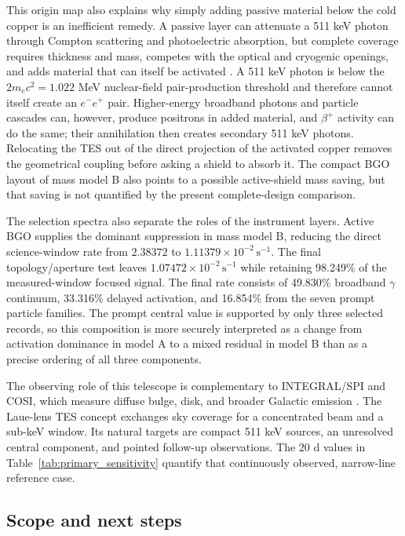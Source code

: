 \documentclass[11pt]{article}
\newcommand{\cps}{\ensuremath{\,\mathrm{s^{-1}}}}
\begin{document}
This origin map also explains why simply adding passive material below the cold
copper is an inefficient remedy. A passive layer can attenuate a 511 keV photon
through Compton scattering and photoelectric absorption, but complete coverage
requires thickness and mass, competes with the optical and cryogenic openings,
and adds material that can itself be activated \cite{NISTXCOM}. A 511 keV
photon is below the $2m_ec^2=1.022$ MeV nuclear-field pair-production
threshold and therefore cannot itself create an $e^-e^+$ pair. Higher-energy
broadband photons and particle cascades can, however, produce positrons in added
material, and $\beta^+$ activity can do the same; their annihilation then
creates secondary 511 keV photons. Relocating the TES out of the direct
projection of the activated copper removes the geometrical coupling before
asking a shield to absorb it. The compact BGO layout of mass model B also points
to a possible active-shield mass saving, but that saving is not quantified by
the present complete-design comparison.

The selection spectra also separate the roles of the instrument layers. Active
BGO supplies the dominant suppression in mass model B, reducing the direct
science-window rate from $2.38372$ to $1.11379\times10^{-2}\cps$. The final
topology/aperture test leaves $1.07472\times10^{-2}\cps$ while retaining
98.249\% of the measured-window focused signal. The final rate consists of
49.830\% broadband $\gamma$ continuum, 33.316\% delayed activation, and 16.854\%
from the seven prompt particle families. The prompt central value is supported
by only three selected records, so this composition is more securely interpreted
as a change from activation dominance in model A to a mixed residual in model B
than as a precise ordering of all three components.

The observing role of this telescope is complementary to INTEGRAL/SPI and COSI,
which measure diffuse bulge, disk, and broader Galactic emission
\cite{Siegert2016AA,Kierans2020,Siegert2020COSI,Yoneda2025,Karwin2023}. The
Laue-lens TES concept exchanges sky coverage for a concentrated beam and a
sub-keV window. Its natural targets are compact 511 keV sources, an unresolved
central component, and pointed follow-up observations. The 20 d values in
Table~\ref{tab:primary_sensitivity} quantify that continuously observed,
narrow-line reference case.

\subsection{Scope and next steps}
\label{subsec:limitations}
\end{document}
